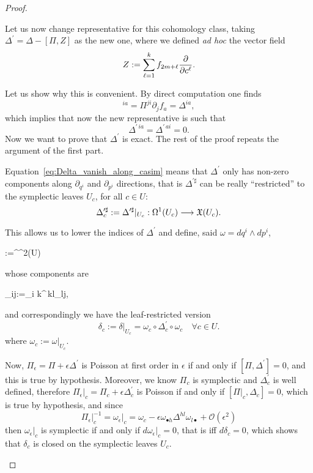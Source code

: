 \documentclass[main.tex]{subfiles}
\begin{document}
\begin{proof}
\begin{enumerate}
		Let us now change representative for this cohomology class, taking $\Delta^\prime=\Delta-[\Pi,Z]$ as the new one, where we defined \textit{ad hoc} the vector field
		\begin{equation}
			Z:=\sum_{\ell=1}^k f_{2m+\ell}\frac{\partial {}}{\partial {c^\ell}}.
		\end{equation}

		Let us show why this is convenient. By direct computation one finds
		\begin{equation}
			[\Pi,Z]^{ia}= \Pi^{ji}\partial_j f_a = \Delta^{ia},
		\end{equation}
		which implies that now the new representative is such that
		\begin{equation}
		\label{eq:Delta_vanish_along_casim}
			\Delta^{\prime\,ia}=\Delta^{\prime\,ai}=0.
		\end{equation}
		Now we want to prove that $\Delta^\prime$ is exact. The rest of the proof repeats the argument of the first part. 
		
		Equation~\eqref{eq:Delta_vanish_along_casim} means that $\Delta^\prime$ only has non-zero components along $\partial_{q^i}$ and $\partial_{p^i}$ directions, that is $\Delta^{\prime\sharp}$ can be really ``restricted'' to the symplectic leaves $U_c$, for all $c\in U$:
		\begin{equation}
			\Delta^{\prime\sharp}_c := \Delta^{\prime\sharp}\vert_{U_c}:\Omega^1(U_c)\longrightarrow\mathfrak{X}(U_c).
		\end{equation}

		This allows us to lower the indices of $\Delta^\prime$ and define, said $\omega=dq^i\wedge dp^i$,
		\begin{eqalign}
			\delta:=\omega\circ\Delta^\prime\circ\omega\in\Omega^2(U)
		\end{eqalign}
		whose components are
		\begin{eqalign}
			\delta_{ij}:=\omega_{i k}\Delta^{\prime\,kl}\omega_{lj},
		\end{eqalign}
		and correspondingly we have the leaf-restricted version
		\begin{equation}
			\delta_c := \delta \vert_{U_c} =\omega_c\circ\Delta^\prime_c\circ\omega_c	\quad	\forall c\in U.
		\end{equation}
		where $\omega_c := \omega\vert_{U_c}$. 
		
		Now, $\Pi_\epsilon=\Pi+\epsilon\Delta^\prime$ is Poisson at first order in $\epsilon$ if and only if $[\Pi, \Delta^\prime]=0$, and this is true by hypothesis. Moreover, we know $\Pi_c$ is symplectic and $\Delta^\prime_c$ is well defined, therefore $\Pi_\epsilon\vert_c=\Pi_c+\epsilon\Delta^\prime_c$ is Poisson if and only if $[\Pi\vert_c,\Delta_c]=0$, which is true by hypothesis, and since
		\begin{equation}
			\Pi_\epsilon\vert_c^{-1}=\omega_\epsilon\vert_c=\omega_c-\epsilon\omega_{\bullet h}\Delta^{hl}\omega_{l\bullet}+\mathcal{O}(\epsilon^2)
		\end{equation}
		then $\omega_\epsilon\vert_c$ is symplectic if and only if $d\omega_\epsilon\vert_c=0$, that is iff $d\delta_c=0$, which shows that $\delta_c$ is closed on the symplectic leaves $U_c$.


\end{enumerate}
\end{proof}
\end{document}
